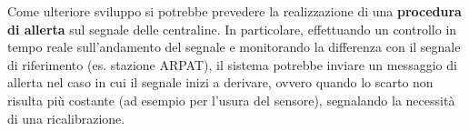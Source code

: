 Come ulteriore sviluppo si potrebbe prevedere la realizzazione di una \textbf{procedura di allerta} sul segnale delle centraline. In particolare, effettuando un controllo in tempo reale sull'andamento del segnale e monitorando la differenza con il segnale di riferimento (es. stazione ARPAT), il sistema potrebbe inviare un messaggio di allerta nel caso in cui il segnale inizi a derivare, ovvero quando lo scarto non risulta più costante (ad esempio per l'usura del sensore), segnalando la necessità di una ricalibrazione.